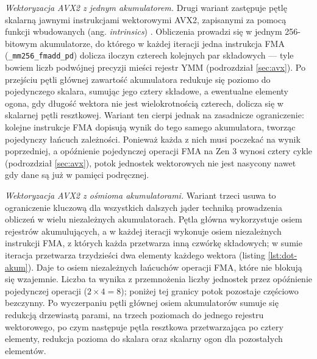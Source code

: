\documentclass[a4paper,12pt]{book} %
\begin{document}
\emph{Wektoryzacja AVX2 z jednym akumulatorem.} Drugi wariant zastępuje pętlę skalarną jawnymi instrukcjami wektorowymi AVX2, zapisanymi za pomocą funkcji wbudowanych (ang. \emph{intrinsics}) \cite{gepner2017avx2}. Obliczenia prowadzi się w jednym 256-bitowym akumulatorze, do którego w każdej iteracji jedna instrukcja FMA (\texttt{\_mm256\_fmadd\_pd}) dolicza iloczyn czterech kolejnych par składowych --- tyle bowiem liczb podwójnej precyzji mieści rejestr YMM (podrozdział \ref{sec:avx}). Po przejściu pętli głównej zawartość akumulatora redukuje się poziomo do pojedynczego skalara, sumując jego cztery składowe, a ewentualne elementy ogona, gdy długość wektora nie jest wielokrotnością czterech, dolicza się w skalarnej pętli resztkowej. Wariant ten cierpi jednak na zasadnicze ograniczenie: kolejne instrukcje FMA dopisują wynik do tego samego akumulatora, tworząc pojedynczy łańcuch zależności. Ponieważ każda z nich musi poczekać na wynik poprzedniej, a opóźnienie pojedynczej operacji FMA na Zen 3 wynosi cztery cykle (podrozdział \ref{sec:avx}), potok jednostek wektorowych nie jest nasycony nawet gdy dane są już w pamięci podręcznej.

\emph{Wektoryzacja AVX2 z ośmioma akumulatorami.} Wariant trzeci usuwa to ograniczenie kluczową dla wszystkich dalszych jąder techniką prowadzenia obliczeń w wielu niezależnych akumulatorach. Pętla główna wykorzystuje osiem rejestrów akumulujących, a w każdej iteracji wykonuje osiem niezależnych instrukcji FMA, z których każda przetwarza inną czwórkę składowych; w sumie iteracja przetwarza trzydzieści dwa elementy każdego wektora (listing \ref{lst:dot-akum}). Daje to osiem niezależnych łańcuchów operacji FMA, które nie blokują się wzajemnie. Liczba ta wynika z przemnożenia liczby jednostek przez opóźnienie pojedynczej operacji ($2 \times 4 = 8$); poniżej tej granicy potok pozostaje częściowo bezczynny. Po wyczerpaniu pętli głównej osiem akumulatorów sumuje się redukcją drzewiastą parami, na trzech poziomach do jednego rejestru wektorowego, po czym następuje pętla resztkowa przetwarzająca po cztery elementy, redukcja pozioma do skalara oraz skalarny ogon dla pozostałych elementów.
\end{document}
